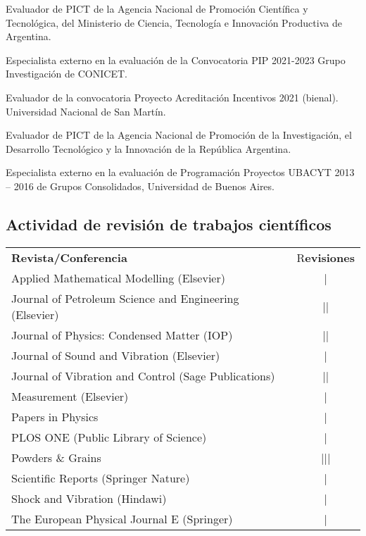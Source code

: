  Evaluador de PICT de la Agencia Nacional de Promoción Científica y Tecnológica, del Ministerio de Ciencia, Tecnología e 
Innovación Productiva de Argentina.

 Especialista externo en la evaluación de la Convocatoria PIP 2021-2023 Grupo Investigación de CONICET.

 Evaluador de la convocatoria Proyecto Acreditación Incentivos 2021 (bienal). Universidad Nacional de San Martín.

 Evaluador de PICT de la Agencia Nacional de Promoción de la Investigación, el Desarrollo Tecnológico y la Innovación de la República Argentina.

 Especialista externo en la evaluación de Programación Proyectos UBACYT 2013 -- 2016 de Grupos Consolidados, Universidad de Buenos Aires.

\subsection{Actividad de revisión de trabajos científicos}
\begin{tabular}{l c}
    \textbf{Revista/Conferencia} & R\textbf{evisiones} \\
    Applied Mathematical Modelling (Elsevier) & | \\ 
    Journal of Petroleum Science and Engineering (Elsevier) & || \\
    Journal of Physics: Condensed Matter (IOP) & || \\
    Journal of Sound and Vibration (Elsevier) & \cancel{||||} | \\
    Journal of Vibration and Control (Sage Publications) & || \\
    Measurement (Elsevier) &  | \\
    Papers in Physics & | \\
    PLOS ONE (Public Library of Science) & | \\
    Powders \& Grains & ||| \\
    Scientific Reports (Springer Nature) & | \\
    Shock and Vibration (Hindawi) &  | \\
    The European Physical Journal E (Springer) & | 
\end{tabular}

